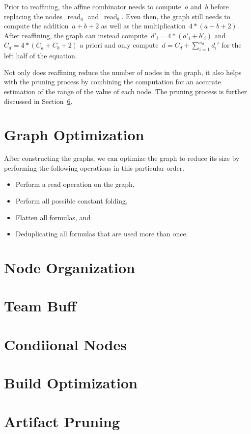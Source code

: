 \documentclass{article}
\DeclareMathOperator{\readNode}{read}
\begin{document}
Prior to reaffining, the affine combinator needs to compute~$a$ and~$b$ before replacing the nodes~$\readNode_a$ and~$\readNode_b$.
Even then, the graph still needs to compute the addition~$a + b + 2$ as well as the multiplication~$4 * (a + b + 2)$.
After reaffining, the graph can instead compute~$d'_i = 4 * (a'_i + b'_i)$ and~$C_d = 4 * (C_a + C_b + 2)$ a priori and only compute~$d=C_d + \sum_{i=1}^{n_d}d_i'$ for the left half of the equation.

Not only does reaffining reduce the number of nodes in the graph, it also helps with the pruning process by combining the computation for an accurate estimation of the range of the value of each node.
The pruning process is further discussed in Section~\ref{sec:pruning}.

\section{Graph Optimization}

After constructing the graphs, we can optimize the graph to reduce its size by performing the following operations in this particular order.
%
\begin{itemize}
	\item Perform a read operation on the graph,
	\item Perform all possible constant folding,
	\item Flatten all formulas, and
	\item Deduplicating all formulas that are used more than once.
\end{itemize}

\section{Node Organization}

\section{Team Buff}
\section{Condiional Nodes}
\section{Build Optimization}
\section{Artifact Pruning}
\label{sec:pruning}
\end{document}
